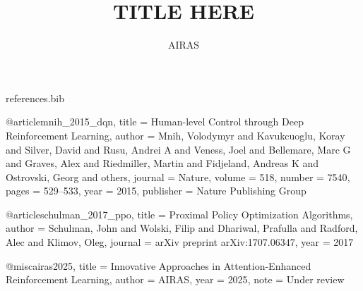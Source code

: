 \begin{filecontents}{references.bib}

@article{mnih_2015_dqn,
  title = {Human-level Control through Deep Reinforcement Learning},
  author = {Mnih, Volodymyr and Kavukcuoglu, Koray and Silver, David and Rusu, Andrei A and Veness, Joel and Bellemare, Marc G and Graves, Alex and Riedmiller, Martin and Fidjeland, Andreas K and Ostrovski, Georg and others},
  journal = {Nature},
  volume = {518},
  number = {7540},
  pages = {529--533},
  year = {2015},
  publisher = {Nature Publishing Group}
}

@article{schulman_2017_ppo,
  title = {Proximal Policy Optimization Algorithms},
  author = {Schulman, John and Wolski, Filip and Dhariwal, Prafulla and Radford, Alec and Klimov, Oleg},
  journal = {arXiv preprint arXiv:1707.06347},
  year = {2017}
}

@misc{airas2025,
  title = {Innovative Approaches in Attention-Enhanced Reinforcement Learning},
  author = {AIRAS},
  year = {2025},
  note = {Under review}
}
\end{filecontents}

\documentclass{article} %
\usepackage{iclr2024_conference,times}

\usepackage[utf8]{inputenc} %
\usepackage[T1]{fontenc}    %
\usepackage{hyperref}       %
\usepackage{url}            %
\usepackage{booktabs}       %
\usepackage{amsfonts}       %
\usepackage{nicefrac}       %
\usepackage{microtype}      %
\usepackage{titletoc}

\usepackage{subcaption}
\usepackage{graphicx}
\usepackage{amsmath}
\usepackage{multirow}
\usepackage{color}
\usepackage{colortbl}
\usepackage{cleveref}
\usepackage{algorithm}
\usepackage{algorithmicx}
\usepackage{algpseudocode}
\usepackage{tikz}
\usepackage{pgfplots}
\usepackage{float}
\usepackage{array}
\usepackage{tabularx}
\pgfplotsset{compat=newest}

\DeclareMathOperator*{\argmin}{arg\,min}
\DeclareMathOperator*{\argmax}{arg\,max}

\graphicspath{{../}} %

\title{TITLE HERE}

\author{AIRAS}

